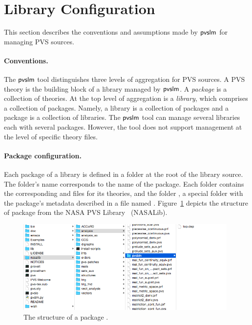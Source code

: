 \section{Library Configuration}
\label{sec.conf}

This section describes the conventions and assumptions made by
$\textsf{pvslm}$ for managing PVS sources.

\paragraph{Conventions.}
The $\textsf{pvslm}$ tool distinguishes three levels of aggregation for PVS
sources. A PVS theory is the building block of a library managed by
$\textsf{pvslm}$. A {\em package} is a collection of theories. At the top
level of aggregation is a {\em library}, which comprises a collection
of packages. Namely, a library is a collection of packages and a
package is a collection of libraries. The $\textsf{pvslm}$ tool can manage
several libraries each with several packages. However, the tool does
not support management at the level of specific theory files.

\paragraph{Package configuration.}
Each package of a library is defined in a folder at the root of the
library source. The folder's name corresponds to the name of the
package. Each folder contains the corresponding  and
 files for its theories, and the folder , a
special folder with the package's metadata described in a file named
. Figure~\ref{fig.package} depicts the structure of
package  from the NASA PVS Library~\cite{nasalib}
(NASALib).

\begin{figure}
  \centering
  \includegraphics[width=11cm]{images/package.png}
  \caption{The structure of a package .}
  \label{fig.package}
\end{figure}

